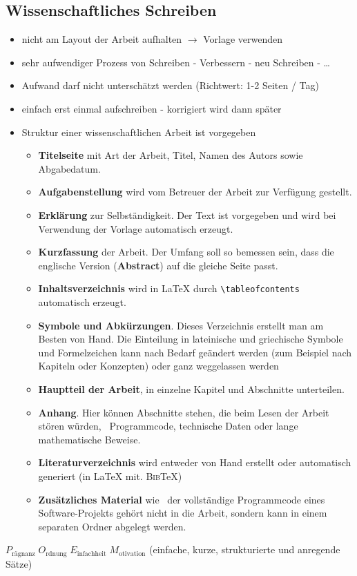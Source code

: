 \newpage


\subsection*{Wissenschaftliches Schreiben}
\label{sec:Wissenschaftliches Schreiben}
\begin{itemize}
	\item nicht am Layout der Arbeit aufhalten $\rightarrow$ Vorlage verwenden
	\item sehr aufwendiger Prozess von Schreiben - Verbessern - neu Schreiben - \ldots
	\item Aufwand darf nicht unterschätzt werden (Richtwert: 1-2 Seiten / Tag)
	\item einfach erst einmal aufschreiben -  korrigiert wird dann später
	\item Struktur einer wissenschaftlichen Arbeit ist vorgegeben
	\begin{itemize}
		\item \textbf{Titelseite} mit Art der Arbeit, Titel, Namen des Autors sowie Abgabedatum.
		\item \textbf{Aufgabenstellung} wird vom Betreuer der Arbeit zur Verfügung
		  gestellt.
		\item \textbf{Erklärung} zur Selbständigkeit. Der Text ist vorgegeben und wird bei Verwendung der Vorlage automatisch erzeugt.
		\item \textbf{Kurzfassung} der Arbeit.
		  Der Umfang soll so bemessen sein, dass die englische Version
		  (\textbf{Abstract}) auf die gleiche Seite passt.
		\item \textbf{Inhaltsverzeichnis} wird in \LaTeX{} durch \verb|\tableofcontents| automatisch
		  erzeugt.
		\item \textbf{Symbole und Abkürzungen}. Dieses Verzeichnis erstellt man am Besten von Hand. Die Einteilung in lateinische und griechische Symbole und Formelzeichen kann nach Bedarf geändert werden (zum Beispiel nach Kapiteln oder Konzepten) oder ganz weggelassen werden
		\item \textbf{Hauptteil der Arbeit}, in einzelne Kapitel und Abschnitte unterteilen.
		\item \textbf{Anhang}. Hier können Abschnitte stehen, die beim Lesen der Arbeit
		  stören würden, \zB\ Programmcode, technische Daten oder lange mathematische
		  Beweise.
		\item \textbf{Literaturverzeichnis} wird entweder von Hand erstellt oder automatisch generiert (in \LaTeX{} \zB mit.
		  \textsc{Bib}\TeX )
		\item \label{itm:Ordner} \textbf{Zusätzliches Material} wie \zB\ der
		  vollständige Programmcode eines Software-Projekts gehört nicht in die Arbeit,
	  sondern kann in einem separaten Ordner abgelegt werden.
	\end{itemize}
\end{itemize}
$P_\text{rägnanz}\; O_\text{rdnung}\; E_\text{infachheit}\; M_\text{otivation}$ (einfache, kurze, strukturierte und anregende Sätze)



